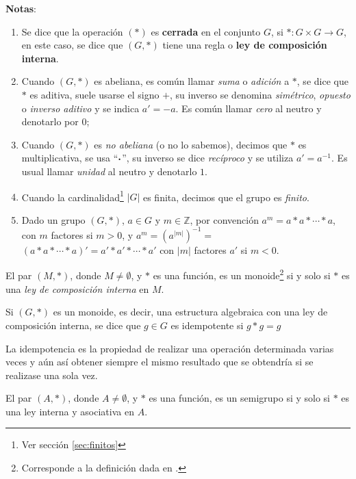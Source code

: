 \textbf{Notas}:
\begin{enumerate}[label=\roman*)]
	\item Se dice que la operación $(*)$ es \textbf{cerrada} en el conjunto $G$, si $*: G \times G \rightarrow G$, en este caso, se dice que $(G, *)$ tiene una regla o \textbf{ley de composición interna}.
	
	\item Cuando $(G, *)$ es abeliana, es común llamar \textit{suma} o \textit{adición} a $*$, se dice que $*$ es aditiva, suele usarse el signo $+$, su inverso se denomina \textit{simétrico}, \textit{opuesto} o \textit{inverso aditivo} y se indica $a' = -a$. Es común llamar \textit{cero} al neutro y denotarlo por $0$;
	\item Cuando $(G, *)$ es \textit{no abeliana} (o no lo sabemos), decimos que $*$ es multiplicativa, se usa ``$\boldsymbol{\cdot}$'', su inverso se dice \textit{recíproco} y se utiliza $a' = a^{-1}$. Es usual llamar \textit{unidad} al neutro y denotarlo $1$.
	\item Cuando la cardinalidad\footnote{Ver sección \ref{sec:finitos}} $|G|$ es finita, decimos que el grupo es \textit{finito}.
	\item Dado un grupo $(G, *)$, $a\in G$ y $m \in \mathbb{Z}$, por convención $a^m = a*a* \cdots *a$, con $m$ factores si $m>0$, y $a^m = (a^{|m|})^{-1} =$ $\left(a*a* \cdots *a\right)' = a'*a'* \cdots *a'$ con $|m|$ factores $a'$ si $m<0$.
\end{enumerate}


\begin{fmd-definition}[Monoide] 
	El par $(M, *)$, donde $M \ne \emptyset$, y $*$ es una función, es un monoide\footnote{Corresponde a la definición dada en \cite{rojoAlgebra8vaEd}  .} si y solo si $*$ es una \textit{ley de composición interna} en $M$.
\end{fmd-definition}

\begin{definition}[Idempotencia] \label{def:idempotencia} 
	Si $(G, *)$ es un monoide, es decir, una estructura algebraica con una ley de composición interna, se dice que $g \in G$ es idempotente si $g * g = g$
	
	La idempotencia es la propiedad de realizar una operación determinada varias veces y aún así obtener siempre el mismo resultado que se obtendría si se realizase una sola vez.
\end{definition}

\begin{fmd-definition}[Semigrupo] 
	El par $(A, *)$, donde $A \ne \emptyset$, y $*$ es una función, es un semigrupo si y solo si $*$ es una ley interna y asociativa en $A$.
\end{fmd-definition}

